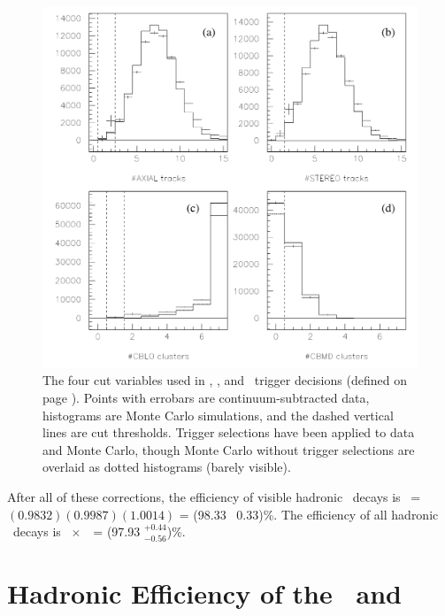\documentclass{cornell}
\begin{document}
\begin{figure}[p]
  \begin{center}
    \includegraphics[width=\linewidth]{plots/triggeragreement}
  \end{center}
  \caption[Test of the Monte Carlo trigger simulation in $e^+e^- \to
  \Upsilon(1S)$]{\label{triggeragreement} The four cut variables used
  in \hadron, \radtau, and \eltrack\ trigger decisions (defined on
  page \pageref{pag:triggerdefs}).  Points with errobars are
  continuum-subtracted data, histograms are Monte Carlo simulations,
  and the dashed vertical lines are cut thresholds.  Trigger
  selections have been applied to data and Monte Carlo, though Monte
  Carlo without trigger selections are overlaid as dotted histograms
  (barely visible).}
\end{figure}

After all of these corrections, the efficiency of visible hadronic
\us\ decays is \ecuts\ = $(0.9832)(0.9987)(1.0014)$ = (98.33 \PM\
0.33)\%.  The efficiency of all hadronic \us\ decays is
\evis~$\times$~\ecuts\ = (97.93 $^{+0.44}_{-0.56}$)\%.

\section{Hadronic Efficiency of the \boldmath \uss\ and \usss}
\label{sec:ussusssefficiency}
\end{document}
